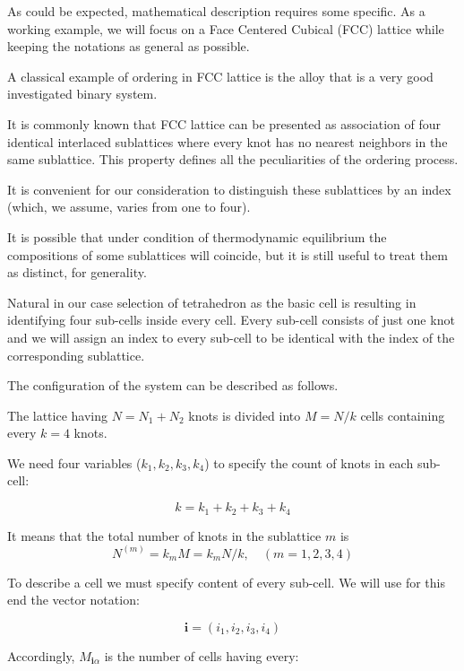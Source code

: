 \documentclass[12pt,abstract]{scrartcl}
\let\ce\ch
\begin{document}
As could be expected, mathematical description requires some specific. 
As a working example, we will focus on a Face Centered Cubical (FCC)  lattice \cite{glazer2013} while keeping the notations as general as possible.

A classical example of ordering in FCC lattice is the \ce{Au-Cu} alloy \cite{Cao2007} that is a very good investigated binary system.

It is commonly known \cite{glazer2013} that FCC lattice can be presented as  association of four identical interlaced sublattices where every knot has no nearest neighbors in the same sublattice.
This property defines all the peculiarities of the ordering process.

It is convenient for our consideration to distinguish  these sublattices  by an index (which, we assume, varies from one to four).

It is possible that under  condition of thermodynamic equilibrium the compositions of some sublattices will coincide, but it is still useful to treat them as distinct, for generality.




Natural in our case selection of tetrahedron as the basic cell is resulting in identifying four sub-cells inside every cell.
Every sub-cell consists of just one knot and we will assign an index to every sub-cell to be identical with the index of the corresponding sublattice.


The configuration of the system can be described as follows.

The lattice having $N = N_1 + N_2$ knots is divided into  $M = N / k$ cells containing every $k = 4$ knots.

We need four variables ($k_1, k_2, k_3, k_4$) to specify the  count of knots in each  sub-cell:


\begin{equation} \label{k3}
    k = k_1 + k_2 + k_3 + k_4
\end{equation}

It means  that the total number of knots in the sublattice $m$  is 
\begin{equation} \label{kiM}
N^{(m)} = k_m M = k_m N / k, \quad (m =1, 2, 3, 4)
\end{equation}


To describe a cell we must specify content of every sub-cell.
We will use for this end the vector notation:

\[
\mathbf{i} = (i_1, i_2, i_3, i_4)
\] 

Accordingly, $M_{\mathbf{i} \alpha}$ is the number of cells having every:
\end{document}
